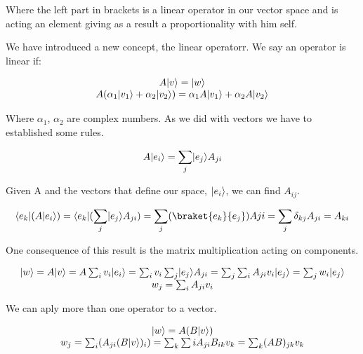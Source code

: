 Where the left part in brackets is a linear operator in our vector space and is acting an element giving as a result a proportionality with him self.

We have introduced a new concept, the linear operatorr. We say an operator is linear if:

\begin{equation}
  \label{6.14}
  \begin{array}{c}
    A \lvert v\rangle = \lvert w\rangle \\
    A(\alpha_1 \lvert v_1\rangle+\alpha_2\lvert v_2\rangle) = \alpha_1 A \lvert v_1\rangle + \alpha_2 A \lvert v_2\rangle
  \end{array}
\end{equation}

Where $\alpha_1$, $\alpha_2$ are complex numbers. As we did with vectors we have to established some rules.

\begin{equation}
  \label{6.15}
  A \lvert e_i\rangle = \sum_{j} \lvert e_j\rangle A_{ji}
\end{equation}

Given A and the vectors that define our space, $\lvert e_i\rangle$, we can find $A_{ij}$.

\begin{equation}
  \label{6.16}
  \bra{e_k}(A \ket{e_i}) =\bra{e_k}(\sum_{j}\ket{e_j}A_{ji}) = \sum_{j} (\braket{e_k}{e_j})Aji = \sum_{j}\delta_{kj}A_{ji}=A_{ki}
\end{equation}

One consequence of this result is the matrix multiplication acting on components.

\begin{equation}
  \label{6.17}
  \begin{array}{c}
    \lvert w\rangle = A \lvert v\rangle = A \sum_{i} v_i\lvert e_i\rangle = \sum_{i} v_i\sum_{j}\lvert e_j\rangle A_{ji} = \sum_j\sum_i A_{ji} v_i \lvert e_j\rangle = \sum_{j} w_i \lvert e_j\rangle\\
    w_j = \sum_{i}A_{ji} v_i
  \end{array}
\end{equation}

We can aply more than one operator to a vector.

\begin{equation}
  \label{6.18}
  \begin{array}{c}
    \lvert w\rangle = A(B \lvert v\rangle) \\
    w_j = \sum_{i}(A_{ji}(B\lvert v\rangle)_i) = \sum_{k}\sum{i}A_{ji}B_{ik}v_k = \sum_{k} (AB)_{jk} v_k
  \end{array}
\end{equation}

